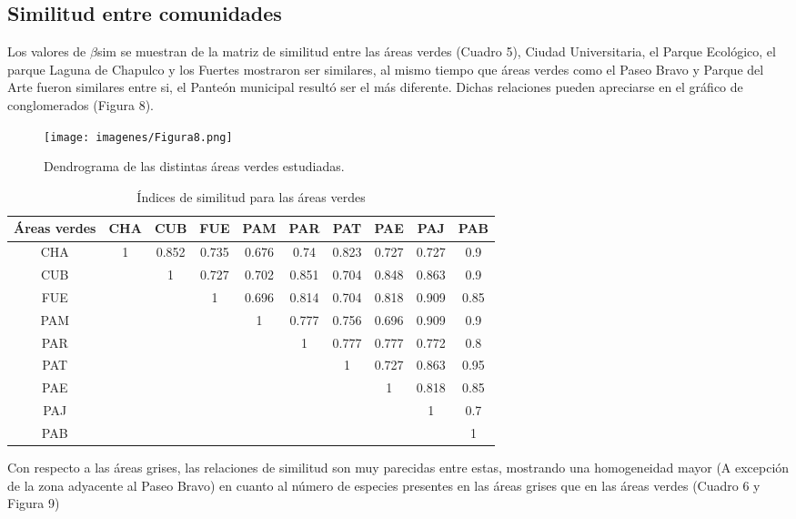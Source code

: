 \documentclass[letterpaper,12pt]{article}
\begin{document}
\subsection{Similitud entre comunidades}
Los valores de $\beta$sim se muestran de la matriz de similitud entre las áreas verdes (Cuadro 5), Ciudad Universitaria, el Parque Ecológico, el parque Laguna de Chapulco y los Fuertes mostraron ser similares, al mismo tiempo que áreas verdes como el Paseo Bravo y Parque del Arte fueron similares entre si, el Panteón municipal resultó ser el más diferente. Dichas relaciones pueden apreciarse en el gráfico de conglomerados (Figura 8).
\begin{center}
\begin{figure}[H]
\texttt{[image: imagenes/Figura8.png]}\\
\caption[Dendrograma de las áreas verdes]{Dendrograma de las distintas áreas verdes estudiadas.}
\end{figure}
\end{center}
\pagebreak
{\footnotesize
\begin{longtable}[c] {cccccccccc} 
\caption[Índices de similitud entre áreas verdes]{Índices de similitud para las áreas verdes } \\
Áreas verdes & CHA & CUB & FUE  & PAM & PAR & PAT & PAE & PAJ & PAB  \\ \midrule
CHA & 1 & 0.852 & 0.735 & 0.676 & 0.74 & 0.823 & 0.727 & 0.727 & 0.9 \\
CUB &  & 1 & 0.727 & 0.702 & 0.851 & 0.704 & 0.848 & 0.863 & 0.9 \\
FUE &  &  & 1 & 0.696 & 0.814 & 0.704 & 0.818 & 0.909 & 0.85 \\ 
PAM &  &  &  & 1 & 0.777 & 0.756 & 0.696 & 0.909 & 0.9 \\
PAR &  & & & & 1 & 0.777 & 0.777 & 0.772 & 0.8 \\ 
PAT & & & & & & 1 & 0.727 & 0.863 & 0.95 \\
PAE & & & & & & & 1 & 0.818 & 0.85 \\
PAJ & & & & & & & & 1 & 0.7 \\
PAB & & & & & & & & & 1 \\ \bottomrule
\end{longtable}
}

Con respecto a las áreas grises, las relaciones de similitud son muy parecidas entre estas, mostrando una homogeneidad mayor (A excepción de la zona adyacente al Paseo Bravo) en cuanto al número de especies presentes en las áreas grises que en las áreas verdes (Cuadro 6 y Figura 9)
\end{document}
